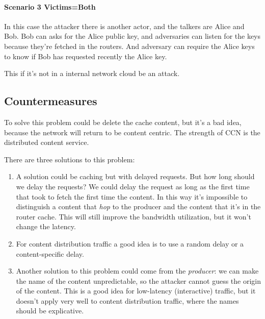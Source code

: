 \paragraph{Scenario 3 Victims=Both}
In this case the attacker there is another actor, and the talkers are Alice and
Bob. Bob can asks for the Alice public key, and adversaries can listen for the
keys because they're fetched in the routers. And adversary can require the
Alice keys to know if Bob has requested recently the Alice key.

This if it's not in a internal network cloud be an attack.

\subsection{Countermeasures}

To solve this problem could be delete the cache content, but it's a bad idea,
because the network will return to be content centric. The strength of CCN is
the distributed content service.

There are three solutions to this problem:
\begin{enumerate}
  \item A solution could be caching but with delayed requests. But how long
should we delay the requests? We could delay the request as long as the
first time that   took to fetch the first time the content. In this way it's
impossible to distinguish a content that \textit{hop} to the producer and the
content that it's in the router cache. This will still improve the bandwidth
utilization, but it won't change the latency.

  \item For content distribution traffic a good idea is to use a random delay 
  or a content-specific delay. 

  \item Another solution to this problem could come from the \textit{producer}:
we can make the name of the content unpredictable, so the attacker cannot
guess the origin of the content. This is a good idea for low-latency (interactive)
traffic, but it doesn't apply very well to content distribution traffic, where the
names should be explicative.

\end{enumerate}

